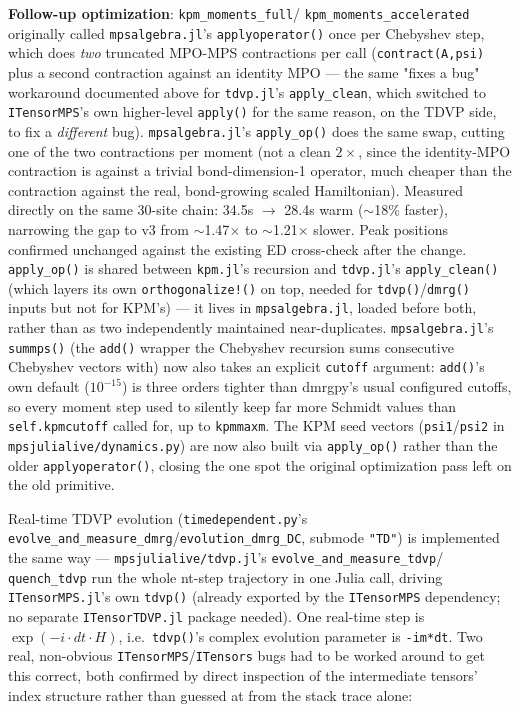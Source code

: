 \documentclass[11pt]{article}
\begin{document}
\textbf{Follow-up optimization}: \texttt{kpm\_moments\_full}/
\texttt{kpm\_moments\_accelerated} originally called
\texttt{mpsalgebra.jl}'s \texttt{applyoperator()} once per Chebyshev
step, which does \emph{two} truncated MPO-MPS contractions per call
(\texttt{contract(A,psi)} plus a second contraction against an identity
MPO --- the same "fixes a bug" workaround documented above for
\texttt{tdvp.jl}'s \texttt{apply\_clean}, which switched to
\texttt{ITensorMPS}'s own higher-level \texttt{apply()} for the same
reason, on the TDVP side, to fix a \emph{different} bug).
\texttt{mpsalgebra.jl}'s \texttt{apply\_op()} does the same
swap, cutting one of the two contractions per moment (not a clean
$2\times$, since the identity-MPO contraction is against a trivial
bond-dimension-1 operator, much cheaper than the contraction against the
real, bond-growing scaled Hamiltonian). Measured directly on the same
30-site chain: 34.5s $\to$ 28.4s warm ($\sim$18\% faster), narrowing the
gap to v3 from $\sim$1.47$\times$ to $\sim$1.21$\times$ slower. Peak
positions confirmed unchanged against the existing ED cross-check after
the change. \texttt{apply\_op()} is shared between \texttt{kpm.jl}'s
recursion and \texttt{tdvp.jl}'s \texttt{apply\_clean()} (which layers
its own \texttt{orthogonalize!()} on top, needed for
\texttt{tdvp()}/\texttt{dmrg()} inputs but not for KPM's) --- it lives in
\texttt{mpsalgebra.jl}, loaded before both, rather than as two
independently maintained near-duplicates. \texttt{mpsalgebra.jl}'s
\texttt{summps()} (the \texttt{add()} wrapper the Chebyshev recursion
sums consecutive Chebyshev vectors with) now also takes an explicit
\texttt{cutoff} argument: \texttt{add()}'s own default ($10^{-15}$) is
three orders tighter than dmrgpy's usual configured cutoffs, so every
moment step used to silently keep far more Schmidt values than
\texttt{self.kpmcutoff} called for, up to \texttt{kpmmaxm}. The KPM seed
vectors (\texttt{psi1}/\texttt{psi2} in
\texttt{mpsjulialive/dynamics.py}) are now also built via
\texttt{apply\_op()} rather than the older \texttt{applyoperator()},
closing the one spot the original optimization pass left on the old
primitive.

Real-time TDVP evolution (\texttt{timedependent.py}'s
\texttt{evolve\_and\_measure\_dmrg}/\texttt{evolution\_dmrg\_DC}, submode
\texttt{"TD"}) is implemented the same way ---
\texttt{mpsjulialive/tdvp.jl}'s \texttt{evolve\_and\_measure\_tdvp}/
\texttt{quench\_tdvp} run the whole nt-step trajectory in one Julia call,
driving \texttt{ITensorMPS.jl}'s own \texttt{tdvp()} (already exported by
the \texttt{ITensorMPS} dependency; no separate \texttt{ITensorTDVP.jl}
package needed). One real-time step is $\exp(-i \cdot dt \cdot H)$, i.e.\
\texttt{tdvp()}'s complex evolution parameter is \texttt{-im*dt}. Two
real, non-obvious \texttt{ITensorMPS}/\texttt{ITensors} bugs had to be
worked around to get this correct, both confirmed by direct inspection
of the intermediate tensors' index structure rather than guessed at from
the stack trace alone:
\end{document}
